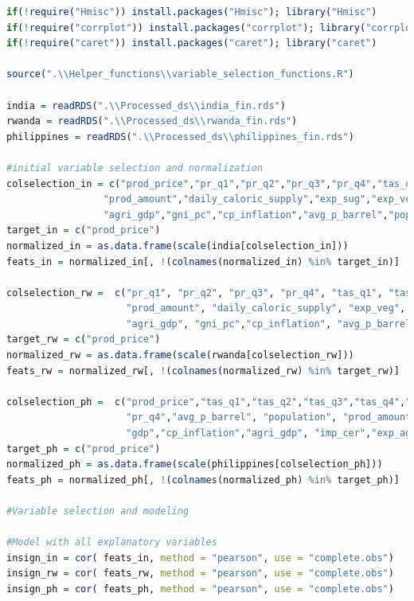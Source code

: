 \documentclass[11pt]{article}
\begin{document}
\begin{lstlisting}[language= R]
if(!require("Hmisc")) install.packages("Hmisc"); library("Hmisc")
if(!require("corrplot")) install.packages("corrplot"); library("corrplot")
if(!require("caret")) install.packages("caret"); library("caret")

source(".\\Helper_functions\\variable_selection_functions.R")

india = readRDS(".\\Processed_ds\\india_fin.rds")
rwanda = readRDS(".\\Processed_ds\\rwanda_fin.rds")
philippines = readRDS(".\\Processed_ds\\philippines_fin.rds")

#initial variable selection and normalization
colselection_in = c("prod_price","pr_q1","pr_q2","pr_q3","pr_q4","tas_q1","tas_q2","tas_q3","tas_q4",
                 "prod_amount","daily_caloric_supply","exp_sug","exp_veg","exp_cer","imp_sug","imp_veg","imp_cer", 
                 "agri_gdp","gni_pc","cp_inflation","avg_p_barrel","population") 
target_in = c("prod_price")
normalized_in = as.data.frame(scale(india[colselection_in]))
feats_in = normalized_in[, !(colnames(normalized_in) %in% target_in)]

colselection_rw =  c("pr_q1", "pr_q2", "pr_q3", "pr_q4", "tas_q1", "tas_q2", "tas_q3", "tas_q4",
                     "prod_amount", "daily_caloric_supply", "exp_veg", "exp_cer", "imp_veg", "imp_cer", 
                     "agri_gdp", "gni_pc","cp_inflation", "avg_p_barrel", "population","prod_price")
target_rw = c("prod_price")
normalized_rw = as.data.frame(scale(rwanda[colselection_rw]))
feats_rw = normalized_rw[, !(colnames(normalized_rw) %in% target_rw)]

colselection_ph =  c("prod_price","tas_q1","tas_q2","tas_q3","tas_q4","pr_q1","pr_q2","pr_q3",
                     "pr_q4","avg_p_barrel", "population", "prod_amount","gni_pc", "exchange_rate",
                     "gdp","cp_inflation","agri_gdp", "imp_cer","exp_agri","daily_caloric_supply")
target_ph = c("prod_price")
normalized_ph = as.data.frame(scale(philippines[colselection_ph]))
feats_ph = normalized_ph[, !(colnames(normalized_ph) %in% target_ph)]

#Variable selection and modeling

#Model with all explanatory variables 
insign_in = cor( feats_in, method = "pearson", use = "complete.obs")
insign_rw = cor( feats_rw, method = "pearson", use = "complete.obs")
insign_ph = cor( feats_ph, method = "pearson", use = "complete.obs")




\end{lstlisting}
\end{document}
